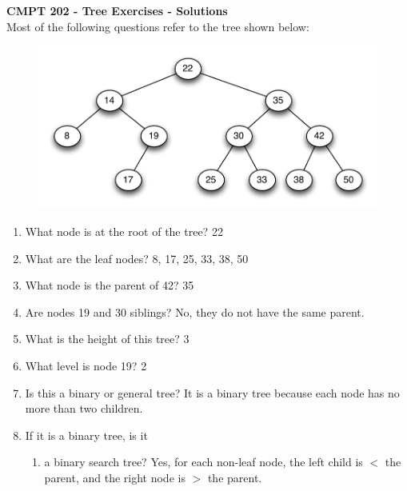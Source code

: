 \documentclass[11pt]{article}
\begin{document}
{\large {\bf CMPT 202 - Tree Exercises - {\color{red} Solutions }} \\

Most of the following questions refer to the tree shown below:





\begin{figure}[h]
\centerline {
\includegraphics[width=5in]{TreeExerciseGraph.pdf}
}
\end{figure}

\begin{enumerate}

\item What node is at the root of the tree? {\color{red} 22}

\item What are the leaf nodes?  {\color{red} 8, 17, 25, 33, 38, 50}

\item What node is the parent of 42? {\color{red} 35}

\item Are nodes 19 and 30 siblings? {\color{red} No, they do not have the same parent.}

\item What is the height of this tree? {\color{red} 3}

\item What level is node 19? {\color{red} 2}

\item Is this a binary or general tree? {\color{red} It is a binary tree because each node has no more than two children.}

\item If it is a binary tree, is it

\begin{enumerate}

\item a binary search tree? {\color{red} Yes, for each non-leaf node, the left child is $<$ the parent, and the right node is $>$ the parent.}


\end{enumerate}
\end{enumerate}}
\end{document}
